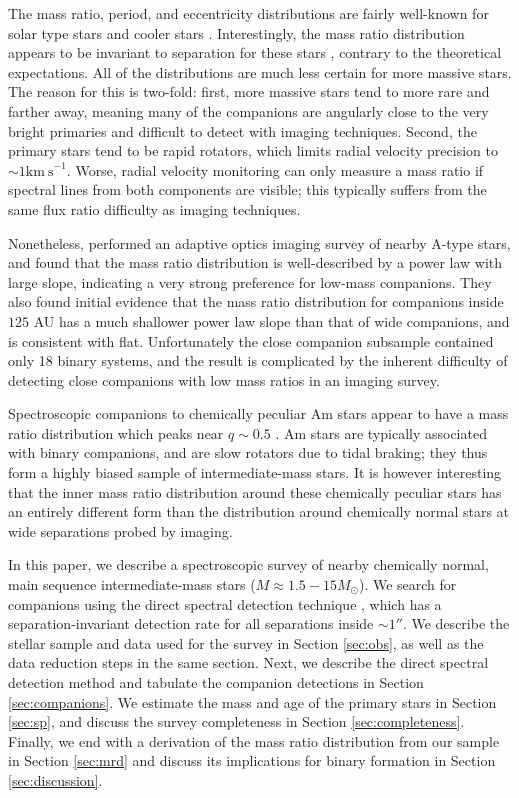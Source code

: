 \documentclass{emulateapj}
\begin{document}
The mass ratio, period, and eccentricity distributions are fairly well-known for solar type stars \citep{Duquennoy1991, Raghavan2010} and cooler stars \citep{Fischer1992, Delfosse2004}. Interestingly, the mass ratio distribution appears to be invariant to separation for these stars \citep{Meyer2013}, contrary to the theoretical expectations. All of the distributions are much less certain for more massive stars. The reason for this is two-fold: first, more massive stars tend to more rare and farther away, meaning many of the companions are angularly close to the very bright primaries and difficult to detect with imaging techniques. Second, the primary stars tend to be rapid rotators, which limits radial velocity precision to $\sim 1 \mathrm{km\ s}^{-1}$. Worse, radial velocity monitoring can only measure a mass ratio if spectral lines from both components are visible; this typically suffers from the same flux ratio difficulty as imaging techniques. 

Nonetheless, \citet{DeRosa2014} performed an adaptive optics imaging survey of nearby A-type stars, and found that the mass ratio distribution is well-described by a power law with large slope, indicating a very strong preference for low-mass companions. They also found initial evidence that the mass ratio distribution for companions inside $125$ AU has a much shallower power law slope than that of wide companions, and is consistent with flat. Unfortunately the close companion subsample contained only 18 binary systems, and the result is complicated by the inherent difficulty of detecting close companions with low mass ratios in an imaging survey. 

Spectroscopic companions to chemically peculiar Am stars appear to have a mass ratio distribution which peaks near $q \sim 0.5$ \citep{Vuissoz2004}. Am stars are typically associated with binary companions, and are slow rotators due to tidal braking; they thus form a highly biased sample of intermediate-mass stars. It is however interesting that the inner mass ratio distribution around these chemically peculiar stars has an entirely different form than the distribution around chemically normal stars at wide separations probed by imaging.

In this paper, we describe a spectroscopic survey of nearby chemically normal, main sequence intermediate-mass stars ($M \approx 1.5 - 15 M_{\odot}$). We search for companions using the direct spectral detection technique \citep{Gullikson2016}, which has a separation-invariant detection rate for all separations inside $\sim 1 ''$. We describe the stellar sample and data used for the survey in Section \ref{sec:obs}, as well as the data reduction steps in the same section. Next, we describe the direct spectral detection method and tabulate the companion detections in Section \ref{sec:companions}. We estimate the mass and age of the primary stars in Section \ref{sec:sp}, and discuss the survey completeness in Section \ref{sec:completeness}. Finally, we end with a derivation of the mass ratio distribution from our sample in Section \ref{sec:mrd} and discuss its implications for binary formation in Section \ref{sec:discussion}.
 
\end{document}
